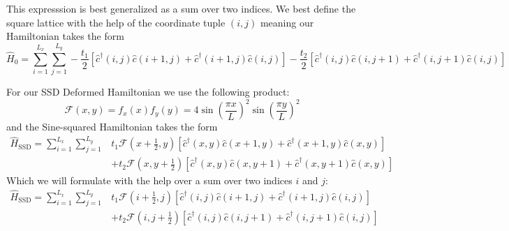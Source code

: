 \documentclass[11pt, a4paper]{article}
\theoremstyle{definition} %
\begin{document}
This expresssion is best generalized as a sum over two indices. We best define the square lattice with the help of the coordinate tuple $(i, j)$ meaning our Hamiltonian takes the form
\begin{equation}
	\hat{H}_0 =  \sum_{i = 1}^{L_x} \sum_{j=1}^{L_y} -\frac{t_1}{2} \left[ \hat{c}^\dagger(i, j) \hat{c}(i+1, j) + \hat{c}^\dagger(i+1, j)\hat{c}(i, j) \right] - \frac{t_2}{2} \left[\hat{c}^\dagger(i,j) \hat{c}(i,j+1) + \hat{c}^\dagger(i, j+1)\hat{c}(i,j) \right]
\end{equation}



For our SSD Deformed Hamiltonian we use the following product:
\begin{equation}
	\mathcal{F}(x,y) = f_x(x)f_y(y) = 4\sin(\frac{\pi x}{L})^2\sin(\frac{\pi y}{L})^2
\end{equation}
and the Sine-squared Hamiltonian takes the form
\begin{equation}
\begin{split}
\hat{H}_\text{SSD} = \sum_{i=1}^{L_x} \sum_{j=1}^{L_y} &t_1 \mathcal{F}\left(x+\frac{1}{2}, y\right) \left[ \hat{c}^\dagger(x,y)\hat{c}(x+1, y) + \hat{c}^\dagger(x+1,y) \hat{c}(x,y)\right] \\
&+ t_2 \mathcal{F}\left(x, y+ \frac{1}{2}\right) \left[\hat{c}^\dagger(x, y) \hat{c}(x, y + 1) + \hat{c}^\dagger(x, y+1) \hat{c}(x,y) \right]
\end{split}
\end{equation}
Which we will formulate with the help over a sum over two indices $i$ and $j$:
\begin{equation}
	\begin{split}
		\hat{H}_\text{SSD} = \sum_{i=1}^{L_x} \sum_{j=1}^{L_y} &t_1 \mathcal{F}\left(i+\frac{1}{2}, j\right) \left[ \hat{c}^\dagger(i,j)\hat{c}(i+1, j) + \hat{c}^\dagger(i+1,j) \hat{c}(i,j)\right] \\
&+ t_2 \mathcal{F}\left(i, j + \frac{1}{2}\right) \left[\hat{c}^\dagger(i, j) \hat{c}(i, j + 1) + \hat{c}^\dagger(i, j+1) \hat{c}(i,j) \right]
	\end{split}
\end{equation}

\end{document}
